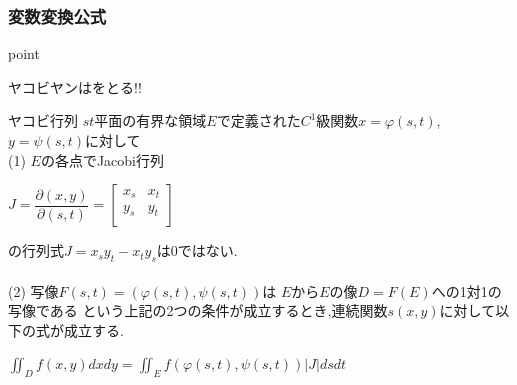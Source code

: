 \documentclass[a4paper]{jsarticle}
\begin{document}
\subsubsection{変数変換公式}
\begin{itembox}[l]{point}
    \begin{center}
        ヤコビヤンはをとる!!
    \end{center}
\end{itembox}
\begin{itembox}[l]{ヤコビ行列}
    $st$平面の有界な領域$E$で定義された$C^1$級関数$x=\varphi\left(s,t\right)$,$y=\psi\left(s,t\right)$に対して\\
    (1) $E$の各点でJacobi行列
    \begin{center}
        $J=\dfrac{\partial\left(x,y\right)}{\partial\left(s,t\right)}=
            \begin{bmatrix}
                x_s & x_t \\
                y_s & y_t \\
            \end{bmatrix}
        $
    \end{center}
    の行列式$J=x_sy_t-x_ty_s$は$0$ではない.\\\\
    (2) 写像$F\left(s,t\right)=\left(\varphi\left(s,t\right),\psi\left(s,t\right)\right)$は
    $E$から$E$の像$D=F\left(E\right)$への1対1の写像である
    という上記の2つの条件が成立するとき,連続関数$s\left(x,y\right)$に対して以下の式が成立する.\\
    \begin{center}
        $\displaystyle\iint_Df\left(x,y\right)dxdy=\iint_Ef\left(\varphi\left(s,t\right),\psi\left(s,t\right)\right)|J|dsdt$
    \end{center}
\end{itembox}
\end{document}
